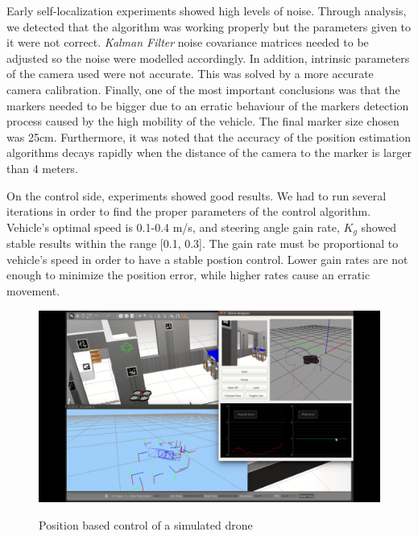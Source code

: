 \documentclass{styles/svproc}
\begin{document}
        Early self-localization experiments showed high levels of noise. Through analysis, we detected that the algorithm was working properly but the parameters given to it were not correct. \textit{Kalman Filter} noise covariance matrices needed to be adjusted so the noise were modelled accordingly. In addition, intrinsic parameters of the camera used were not accurate. This was solved by a more accurate camera calibration. Finally, one of the most important conclusions was that the markers needed to be bigger due to an erratic behaviour of the markers detection process caused by the high mobility of the vehicle. The final marker size chosen was 25cm. Furthermore, it was noted that the accuracy of the position estimation algorithms decays rapidly when the distance of the camera to the marker is larger than 4 meters.

	
	On the control side, experiments showed good results. We had to run several iterations in order to find the proper parameters of the control algorithm. Vehicle's optimal speed is 0.1-0.4 m/s, and steering angle gain rate, $ K_{g}$ showed stable results within the range [0.1, 0.3]. The gain rate must be proportional to vehicle's speed in order to have a stable postion control. Lower gain rates are not enough to minimize the position error, while higher rates cause an erratic movement.
	
	\begin{figure}[h!]
		\begin{center}
                {\includegraphics[width=12cm]{simnavigation.png}}
		\end{center}
                \label{fig:simnavigation}
		\caption{Position based control of a simulated drone}
	\end{figure}
\end{document}
